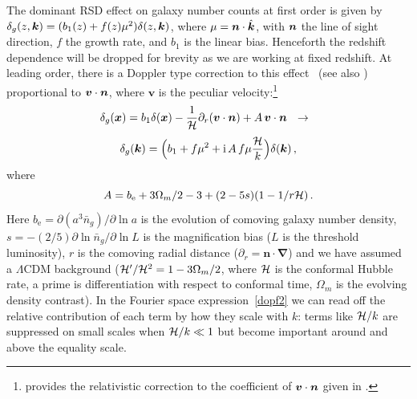  The dominant RSD effect on galaxy number counts at first order is given by $\delta_g(z,\bm {k}) = (b_{1}(z) + f (z) \mu^{2})\delta(z,\bm {k})$, where $\mu=\bm {n}\cdot\hat{\bm {k}}$, with $\bm {n}$ the line of sight direction, $f$ the growth rate, and $b_1$ is the linear bias. Henceforth the redshift dependence will be dropped for brevity as we are working at fixed redshift. At leading order, there is a Doppler type correction to this effect~\citep{Kaiser:1987qv,McDonald:2009dh,Challinor:2011bk} (see also \citep{Raccanelli:2016avd,Hall:2016bmm,Abramo:2017xnp}) proportional to $\bm{v}\cdot\bm {n}$, where $\bm{v}$ is the peculiar velocity:\footnote{\citep{Challinor:2011bk} provides the relativistic correction to the coefficient of  $\bm{v}\cdot\bm {n}$ given in \citep{Kaiser:1987qv,McDonald:2009dh}.}
\begin{equation} \label{dopf}
\delta_g(\bm {x}) = b_{1} \delta(\bm {x})-{\frac{1}{\mathcal{H}}}\partial_r(\bm{v}\cdot\bm {n}) +{A}\,\bm{v}\cdot\bm {n} ~~\to~~
\end{equation}
\begin{equation} \delta_g(\bm {k})=\Big(b_1+f\mu^2+\mathrm{i\,} {A}\,f \mu{\frac{\mathcal{H}}{k}}\Big)\delta(\bm {k})\,,\label{dopf2}
\end{equation}
where  
\begin{equation}
{A} = {b_{\textrm{e}}+{3}\Omega_m/2 -3 + (2-5s) (1-{1/ r\mathcal{H}} )}\,.
\end{equation}
Here $b_{\textrm{e}}=\partial (a^3 \bar{n}_g)/\partial \ln a$ is the evolution of comoving galaxy number density, $s=-(2/5)\partial \ln \bar{n}_g/\partial \ln L$ is the magnification bias ($L$ is the threshold luminosity), $r$ is the comoving radial distance ($\partial_r=\bm n\cdot\bm\nabla$) and we have assumed a $\Lambda$CDM background ($\mathcal{H}'/\mathcal{H}^2=1-3\Omega_m/2$, where $\mathcal{H}$ is the conformal Hubble rate, a prime is differentiation with respect to conformal time, $\Omega_m$ is the evolving density contrast). In the  Fourier space expression~\eqref{dopf2} we can read off the relative contribution of each term by how they scale with $k$: terms like $\mathcal{H}/k$ are suppressed on small scales when $\mathcal{H}/k\ll1$ but become important around and above the equality scale. 


